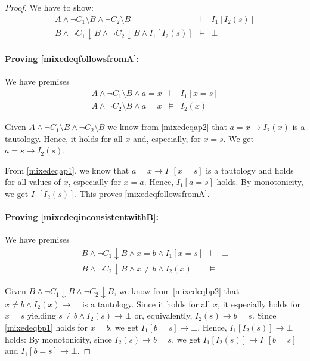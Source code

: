 \documentclass[a4paper]{article}
\theoremstyle{definition}
\newcommand\restrictB{\downarrow B}
\newcommand\withoutB{\setminus B}
\begin{document}
\begin{proof}
  We have to show:
  \begin{eqnarray}
    A\wedge\neg C_1\withoutB\wedge\neg C_2\withoutB&\models&I_1[I_2(s)]\label{mixedeqfollowsfromA}\\
    B\wedge\neg C_1\restrictB\wedge\neg C_2\restrictB\wedge I_1[I_2(s)]&\models&\bot\label{mixedeqinconsistentwithB}
  \end{eqnarray}
  
  \paragraph{Proving \ref{mixedeqfollowsfromA}:}
  We have premises
  \begin{eqnarray}
    A\wedge\neg C_1\withoutB\wedge a=x&\models&I_1[x=s]\label{mixedeqap1}\\
    A\wedge\neg C_2\withoutB\wedge a=x&\models&I_2(x)\label{mixedeqap2}
  \end{eqnarray}

  Given $A\wedge\neg C_1\withoutB\wedge\neg C_2\withoutB$ we know from \ref{mixedeqap2} that $a=x\rightarrow I_2(x)$ is a tautology.
  Hence, it holds for all $x$ and, especially, for $x=s$.
  We get $a=s\rightarrow I_2(s)$.

  From \ref{mixedeqap1}, we know that $a=x\rightarrow I_1[x=s]$ is a tautology and holds for all values of $x$, especially for $x=a$.
  Hence, $I_1[a=s]$ holds.
  By monotonicity, we get $I_1[I_2(s)]$.
  This proves \ref{mixedeqfollowsfromA}.

  \paragraph{Proving \ref{mixedeqinconsistentwithB}:}
  We have premises
  \begin{eqnarray}
    B\wedge\neg C_1\restrictB\wedge x=b\wedge I_1[x=s]&\models&\bot\label{mixedeqbp1}\\
    B\wedge\neg C_2\restrictB\wedge x\ne b\wedge I_2(x)&\models&\bot\label{mixedeqbp2}
  \end{eqnarray}
  
  Given $B\wedge\neg C_1\restrictB\wedge\neg C_2\restrictB$, we know from \ref{mixedeqbp2} that $x\ne b\wedge I_2(x)\rightarrow\bot$ is a tautology.
  Since it holds for all $x$, it especially holds for $x=s$ yielding $s\ne b\wedge I_2(s)\rightarrow \bot$ or, equivalently, $I_2(s)\rightarrow b=s$.
  Since \ref{mixedeqbp1} holds for $x=b$, we get $I_1[b=s]\rightarrow\bot$.
  Hence, $I_1[I_2(s)]\rightarrow\bot$ holds:
  By monotonicity, since $I_2(s)\rightarrow b=s$, we get $I_1[I_2(s)]\rightarrow I_1[b=s]$ and $I_1[b=s]\rightarrow\bot$.
\end{proof}
\end{document}
